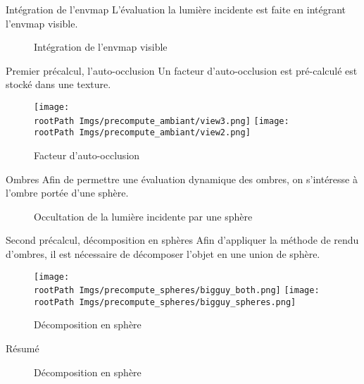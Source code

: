 \documentclass{beamer}
\newcommand*{\rootPath}{}
\begin{document}
\begin{frame}{Intégration de l'envmap}
	L'évaluation la lumière incidente est faite en intégrant l'envmap visible.
	\begin{figure}[!ht]
		\centering
		
		\caption{Intégration de l'envmap visible}
	\end{figure}	
\end{frame}	

\begin{frame}{Premier précalcul, l'auto-occlusion}
	Un facteur d'auto-occlusion est pré-calculé est stocké dans une texture.
	\begin{figure}[!ht]
		\centering
			\texttt{[image: \\rootPath Imgs/precompute\_ambiant/view3.png]}
			\hspace{0.5cm}
			\texttt{[image: \\rootPath Imgs/precompute\_ambiant/view2.png]}
		\caption{Facteur d'auto-occlusion}
	\end{figure}	
\end{frame}	

\begin{frame}{Ombres}
	Afin de permettre une évaluation dynamique des ombres, on s’intéresse à l'ombre portée d'une sphère.
	\begin{figure}[!ht]
		\centering
		
		\caption{Occultation de la lumière incidente par une sphère}
	\end{figure}	
\end{frame}	

\begin{frame}{Second précalcul, décomposition en sphères}
	Afin d'appliquer la méthode de rendu d'ombres, il est nécessaire de décomposer l'objet en une union de sphère.
	\begin{figure}[!ht]
		\centering
			\texttt{[image: \\rootPath Imgs/precompute\_spheres/bigguy\_both.png]}
			\hspace{0.5cm}
			\texttt{[image: \\rootPath Imgs/precompute\_spheres/bigguy\_spheres.png]}
		\caption{Décomposition en sphère}
	\end{figure}	
\end{frame}	

\begin{frame}{Résumé}
	\begin{figure}[!ht]
		\centering
			
		\caption{Décomposition en sphère}
	\end{figure}	
\end{frame}	
\end{document}
